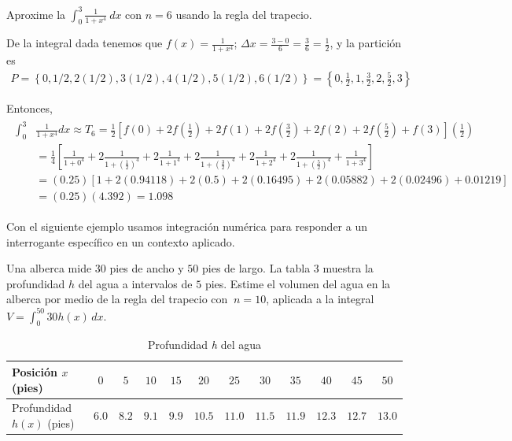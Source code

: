 \begin{ejemplo}
  Aproxime la $\int_{0}^{3}\frac{1}{1+x^{4}}\ dx$ con $n=6$ usando la regla del trapecio.
\end{ejemplo}

De la integral dada tenemos que $f(x)=\frac{1}{1+x^{4}}$; $\Delta x=\frac{3-0}{6}=\frac{3}{6}=\frac{1}{2}$, y la partición es
\begin{gather*}
  P=\left\{0,1/2,2(1/2),3(1/2),4(1/2),5(1/2%
  ),6(1/2)\right\}=\left\{0,\frac{1}{2},1,\frac{3}{2},2,\frac{5}{2},3\right\}
\end{gather*}

Entonces,
\begin{gather*}
  \begin{aligned}
    \int_{0}^{3}&\frac{1}{1+x^{4}}dx\approx T_6=\frac{1}{2}\left[ f(0)+2f(\frac{1}{2})+2f(1)+2f(\frac{3}{2})+2f(2)
    +2f(\frac{5}{2})+f(3)\right] \left( \frac{1}{2}\right)\\
    &=\frac{1}{4}\left[ \frac{1}{1+0^{4}}+2\frac{1}{1+(\frac{1}{2}%
      )^{4}}+2\frac{1}{1+1^{4}}+2\frac{1}{1+(\frac{3}{2})^{4}}+2\frac{1}{1+2^{4}}
    +2\frac{1}{1+(\frac{5}{2})^{4}}+\frac{1}{1+3^{4}}\right]\\
    &=(0.25)\left[ 1+2(0.94118)+2(0.5)+2(0.16495)
      +2(0.05882)
    +2(0.02496)+0.01219\right]\\
    &=(0.25)(4.392)=1.098
  \end{aligned}
\end{gather*}

Con el siguiente ejemplo usamos integración numérica para responder a un interrogante específico en un contexto aplicado.

\begin{ejemplo}
  Una alberca mide $30$ pies de ancho y $50$ pies de largo. La tabla 3 muestra la profundidad $h$ del agua a intervalos de $5$ pies. Estime el volumen del agua en la alberca por medio de la regla del trapecio con $\ n=10$, aplicada a la integral $V=\int_{0}^{50}30h(x)\,dx$.
\end{ejemplo}

\begin{table}[H]
  \centering
  \caption{Profundidad \textit{h} del agua}
  \begin{footnotesize}
    \centering
    \setlength{\tabcolsep}{3pt}
    \begin{tabular}{|l|c|c|c|c|c|c|c|c|c|c|c|}
      \hline
      Posición $x$ (pies) & $0$ & $5$ &$10$ & $15$ & $20$ & $25$ & $30$ & $35$ & $40$ & $45$ & $50$\\
      \hline
      Profundidad $h(x)$ (pies) & $6.0$& $8.2$ & $9.1$ & $9.9$ & $10.5$ & $11.0$ & $11.5$ & $11.9$ & $12.3$ & $12.7$ & $13.0$ \\ \hline
    \end{tabular}
  \end{footnotesize}
  \propia
\end{table}

